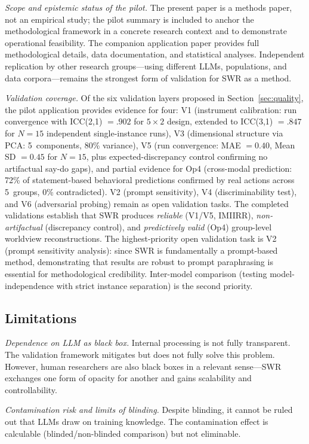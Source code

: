 \documentclass[11pt,a4paper]{article}
\theoremstyle{definition}
\theoremstyle{plain}
\theoremstyle{remark}
\begin{document}
\emph{Scope and epistemic status of the pilot.} The present paper is a methods paper, not an empirical study; the pilot summary is included to anchor the methodological framework in a concrete research context and to demonstrate operational feasibility. The companion application paper \citep{Geiger2026b} provides full methodological details, data documentation, and statistical analyses. Independent replication by other research groups---using different LLMs, populations, and data corpora---remains the strongest form of validation for SWR as a method.

\emph{Validation coverage.} Of the six validation layers proposed in Section~\ref{sec:quality}, the pilot application provides evidence for four: V1 (instrument calibration: run convergence with ICC(2,1) $= .902$ for $5 \times 2$ design, extended to ICC(3,1) $= .847$ for $N = 15$ independent single-instance runs), V3 (dimensional structure via PCA: 5~components, 80\% variance), V5 (run convergence: MAE $= 0.40$, Mean SD $= 0.45$ for $N = 15$, plus expected-discrepancy control confirming no artifactual say-do gaps), and partial evidence for Op4 (cross-modal prediction: 72\% of statement-based behavioral predictions confirmed by real actions across 5~groups, 0\% contradicted). V2 (prompt sensitivity), V4 (discriminability test), and V6 (adversarial probing) remain as open validation tasks. The completed validations establish that SWR produces \emph{reliable} (V1/V5, IMIIRR), \emph{non-artifactual} (discrepancy control), and \emph{predictively valid} (Op4) group-level worldview reconstructions. The highest-priority open validation task is V2 (prompt sensitivity analysis): since SWR is fundamentally a prompt-based method, demonstrating that results are robust to prompt paraphrasing is essential for methodological credibility. Inter-model comparison (testing model-independence with strict instance separation) is the second priority.

\subsection{Limitations}

\emph{Dependence on LLM as black box.} Internal processing is not fully transparent. The validation framework mitigates but does not fully solve this problem. However, human researchers are also black boxes in a relevant sense---SWR exchanges one form of opacity for another and gains scalability and controllability.

\emph{Contamination risk and limits of blinding.} Despite blinding, it cannot be ruled out that LLMs draw on training knowledge. The contamination effect is calculable (blinded/non-blinded comparison) but not eliminable.
\end{document}

